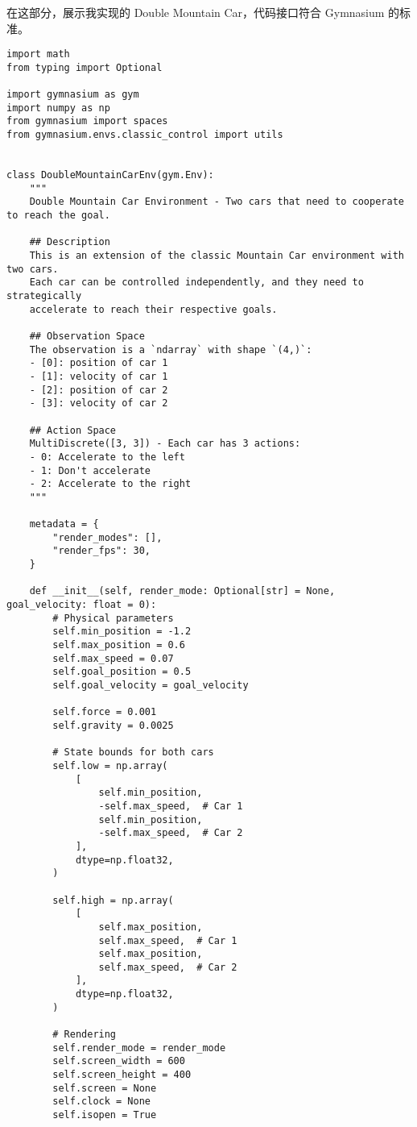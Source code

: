 在这部分，展示我实现的 Double Mountain Car，代码接口符合 Gymnasium 的标准。

\begin{verbatim}
import math
from typing import Optional

import gymnasium as gym
import numpy as np
from gymnasium import spaces
from gymnasium.envs.classic_control import utils


class DoubleMountainCarEnv(gym.Env):
    """
    Double Mountain Car Environment - Two cars that need to cooperate to reach the goal.

    ## Description
    This is an extension of the classic Mountain Car environment with two cars.
    Each car can be controlled independently, and they need to strategically
    accelerate to reach their respective goals.

    ## Observation Space
    The observation is a `ndarray` with shape `(4,)`:
    - [0]: position of car 1
    - [1]: velocity of car 1
    - [2]: position of car 2
    - [3]: velocity of car 2

    ## Action Space
    MultiDiscrete([3, 3]) - Each car has 3 actions:
    - 0: Accelerate to the left
    - 1: Don't accelerate
    - 2: Accelerate to the right
    """

    metadata = {
        "render_modes": [],
        "render_fps": 30,
    }

    def __init__(self, render_mode: Optional[str] = None, goal_velocity: float = 0):
        # Physical parameters
        self.min_position = -1.2
        self.max_position = 0.6
        self.max_speed = 0.07
        self.goal_position = 0.5
        self.goal_velocity = goal_velocity

        self.force = 0.001
        self.gravity = 0.0025

        # State bounds for both cars
        self.low = np.array(
            [
                self.min_position,
                -self.max_speed,  # Car 1
                self.min_position,
                -self.max_speed,  # Car 2
            ],
            dtype=np.float32,
        )

        self.high = np.array(
            [
                self.max_position,
                self.max_speed,  # Car 1
                self.max_position,
                self.max_speed,  # Car 2
            ],
            dtype=np.float32,
        )

        # Rendering
        self.render_mode = render_mode
        self.screen_width = 600
        self.screen_height = 400
        self.screen = None
        self.clock = None
        self.isopen = True


\end{verbatim}
